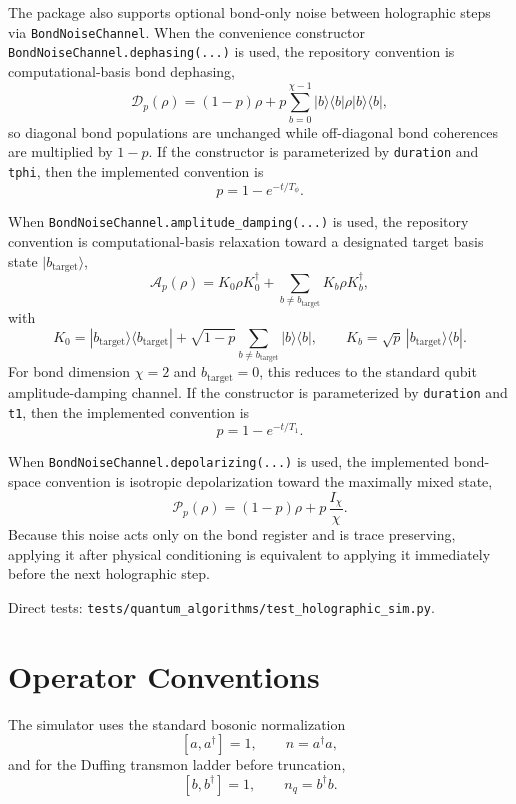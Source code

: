 \documentclass[11pt]{article}
\begin{document}
\noindent
The package also supports optional bond-only noise between holographic steps via
\texttt{BondNoiseChannel}. When the convenience constructor
\texttt{BondNoiseChannel.dephasing(...)} is used, the repository convention is
computational-basis bond dephasing,
\[
\mathcal{D}_p(\rho)
=
(1-p)\rho
+ p \sum_{b=0}^{\chi-1} |b\rangle\langle b|\rho|b\rangle\langle b|,
\]
so diagonal bond populations are unchanged while off-diagonal bond coherences
are multiplied by \(1-p\). If the constructor is parameterized by
\texttt{duration} and \texttt{tphi}, then the implemented convention is
\[
p = 1 - e^{-t / T_\phi}.
\]

\noindent
When \texttt{BondNoiseChannel.amplitude\_damping(...)} is used, the repository
convention is computational-basis relaxation toward a designated target basis
state \(|b_\mathrm{target}\rangle\),
\[
\mathcal{A}_p(\rho)
=
K_0\rho K_0^\dagger
+
\sum_{b \neq b_\mathrm{target}} K_b\rho K_b^\dagger,
\]
with
\[
K_0
=
|b_\mathrm{target}\rangle\langle b_\mathrm{target}|
+
\sqrt{1-p}
\sum_{b \neq b_\mathrm{target}}
|b\rangle\langle b|,
\qquad
K_b = \sqrt{p}\,|b_\mathrm{target}\rangle\langle b|.
\]
For bond dimension \(\chi=2\) and \(b_\mathrm{target}=0\), this reduces to the
standard qubit amplitude-damping channel. If the constructor is parameterized
by \texttt{duration} and \texttt{t1}, then the implemented convention is
\[
p = 1 - e^{-t / T_1}.
\]

\noindent
When \texttt{BondNoiseChannel.depolarizing(...)} is used, the implemented
bond-space convention is isotropic depolarization toward the maximally mixed
state,
\[
\mathcal{P}_p(\rho) = (1-p)\rho + p\,\frac{I_\chi}{\chi}.
\]
Because this noise acts only on the bond register and is trace preserving,
applying it after physical conditioning is equivalent to applying it immediately
before the next holographic step.

\noindent
Direct tests:
\texttt{tests/quantum\_algorithms/test\_holographic\_sim.py}.

\section{Operator Conventions}
The simulator uses the standard bosonic normalization
\[
[a,a^\dagger]=1,\qquad n=a^\dagger a,
\]
and for the Duffing transmon ladder before truncation,
\[
[b,b^\dagger]=1,\qquad n_q=b^\dagger b.
\]
\end{document}
